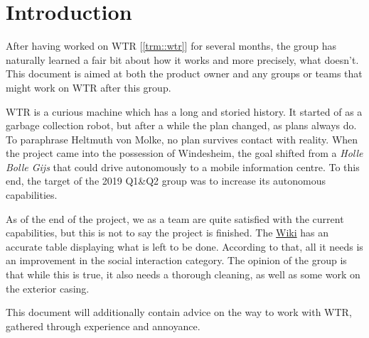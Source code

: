 \section{Introduction}
\label{sec::intro}

After having worked on WTR [\ref{trm::wtr}] for several months, the group has naturally learned a fair bit about how it works and more precisely, what doesn't.
This document is aimed at both the product owner and any groups or teams that might work on WTR after this group.

WTR is a curious machine which has a long and storied history.
It started of as a garbage collection robot, but after a while the plan changed, as plans always do.
To paraphrase Heltmuth von Molke, no plan survives contact with reality.
When the project came into the possession of Windesheim, the goal shifted from a \textit{Holle Bolle Gijs} that could drive autonomously to a mobile information centre.
To this end, the target of the 2019 Q1\&Q2 group was to increase its autonomous capabilities.

As of the end of the project, we as a team are quite satisfied with the current capabilities, but this is not to say the project is finished.
The \href{https://windesheim-willy.github.io/WillyWiki/}{Wiki} has an accurate table displaying what is left to be done.
According to that, all it needs is an improvement in the social interaction category.
The opinion of the group is that while this is true, it also needs a thorough cleaning, as well as some work on the exterior casing.

This document will additionally contain advice on the way to work with WTR, gathered through experience and annoyance.
\newpage 